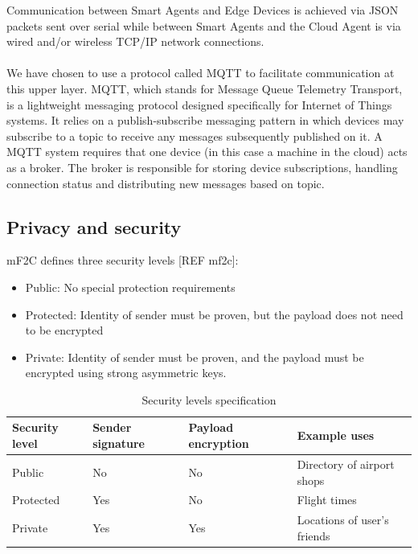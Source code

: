 Communication between Smart Agents and Edge Devices is achieved via JSON packets sent over serial while between Smart Agents and the Cloud Agent is via wired and/or wireless TCP/IP network connections.
 
\paragraph{}
We have chosen to use a protocol called MQTT to facilitate communication at this upper layer. MQTT, which stands for Message Queue Telemetry Transport, is a lightweight messaging protocol designed specifically for Internet of Things systems. It relies on a publish-subscribe messaging pattern in which devices may subscribe to a topic to receive any messages subsequently published on it. A MQTT system requires that one device (in this case a machine in the cloud) acts as a broker. The broker is responsible for storing device subscriptions, handling connection status and distributing new messages based on topic.

\subsection{Privacy and security}

mF2C defines three security levels [REF mf2c]:

\begin{itemize}
    \item Public: No special protection requirements
    \item Protected: Identity of sender must be proven, but the payload does not need to be encrypted
    \item Private: Identity of sender must be proven, and the payload must be encrypted using strong asymmetric keys.
\end{itemize}

\begin{table}[h!]
    \begin{center}
        \begin{tabular}{ |p{2cm}|p{3cm}|p{3cm}|p{4cm}| } 
            \hline
            Security level & Sender signature & Payload encryption & Example uses \\ \hline
            Public & No & No & Directory of airport shops \\ \hline
            Protected & Yes & No & Flight times \\ \hline
            Private & Yes & Yes & Locations of user's friends \\
            \hline
        \end{tabular}
        \caption{Security levels specification}
        \label{table:secure_levels}
    \end{center}
\end{table}    

